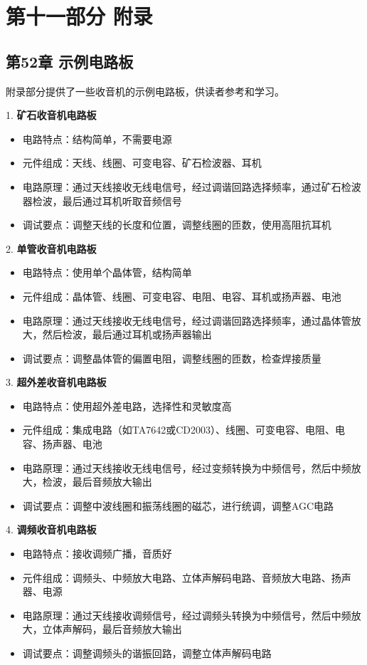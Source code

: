 \documentclass[12pt,UTF8]{ctexbook}
\begin{document}
\part*{第十一部分 附录}

\chapter*{第52章 示例电路板}

附录部分提供了一些收音机的示例电路板，供读者参考和学习。

1. \textbf{矿石收音机电路板}
   \begin{itemize}[leftmargin=3.5em]
   \item 电路特点：结构简单，不需要电源
   \item 元件组成：天线、线圈、可变电容、矿石检波器、耳机
   \item 电路原理：通过天线接收无线电信号，经过调谐回路选择频率，通过矿石检波器检波，最后通过耳机听取音频信号
   \item 调试要点：调整天线的长度和位置，调整线圈的匝数，使用高阻抗耳机
   \end{itemize}

2. \textbf{单管收音机电路板}
   \begin{itemize}[leftmargin=3.5em]
   \item 电路特点：使用单个晶体管，结构简单
   \item 元件组成：晶体管、线圈、可变电容、电阻、电容、耳机或扬声器、电池
   \item 电路原理：通过天线接收无线电信号，经过调谐回路选择频率，通过晶体管放大，然后检波，最后通过耳机或扬声器输出
   \item 调试要点：调整晶体管的偏置电阻，调整线圈的匝数，检查焊接质量
   \end{itemize}

3. \textbf{超外差收音机电路板}
   \begin{itemize}[leftmargin=3.5em]
   \item 电路特点：使用超外差电路，选择性和灵敏度高
   \item 元件组成：集成电路（如TA7642或CD2003）、线圈、可变电容、电阻、电容、扬声器、电池
   \item 电路原理：通过天线接收无线电信号，经过变频转换为中频信号，然后中频放大，检波，最后音频放大输出
   \item 调试要点：调整中波线圈和振荡线圈的磁芯，进行统调，调整AGC电路
   \end{itemize}

4. \textbf{调频收音机电路板}
   \begin{itemize}[leftmargin=3.5em]
   \item 电路特点：接收调频广播，音质好
   \item 元件组成：调频头、中频放大电路、立体声解码电路、音频放大电路、扬声器、电源
   \item 电路原理：通过天线接收调频信号，经过调频头转换为中频信号，然后中频放大，立体声解码，最后音频放大输出
   \item 调试要点：调整调频头的谐振回路，调整立体声解码电路
   \end{itemize}
\end{document}
